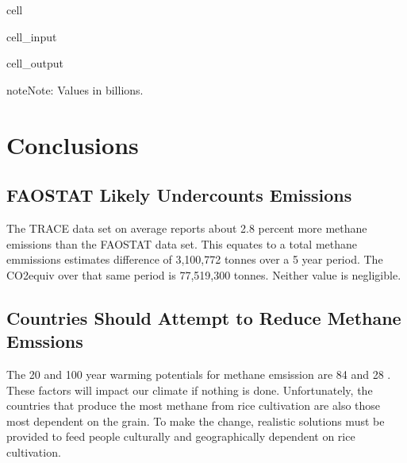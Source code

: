 \documentclass[letterpaper,10pt,english]{jupyterBook}
\begin{document}
\begin{sphinxuseclass}{cell}
\begin{sphinxVerbatimInput}
\begin{sphinxuseclass}{cell_input}
\end{sphinxuseclass}\end{sphinxVerbatimInput}
\begin{sphinxVerbatimOutput}

\begin{sphinxuseclass}{cell_output}
\noindent{}

\end{sphinxuseclass}\end{sphinxVerbatimOutput}

\end{sphinxuseclass}
\begin{sphinxadmonition}{note}{Note:}
\sphinxAtStartPar
Values in billions.
\end{sphinxadmonition}


\section{Conclusions}
\label{\detokenize{notebooks/full_post:conclusions}}

\subsection{FAOSTAT Likely Undercounts Emissions}
\label{\detokenize{notebooks/full_post:faostat-likely-undercounts-emissions}}
\sphinxAtStartPar
The TRACE data set on average reports about 2.8 percent more methane emissions than the FAOSTAT data set.  This equates to a total methane emmissions estimates difference of 3,100,772 tonnes over a 5 year period.  The CO2equiv over that same period is 77,519,300 tonnes.  Neither value is negligible.


\subsection{Countries Should Attempt to Reduce Methane Emssions}
\label{\detokenize{notebooks/full_post:countries-should-attempt-to-reduce-methane-emssions}}
\sphinxAtStartPar
The 20 and 100 year warming potentials for methane emsission are 84 and 28 .  These factors will impact our climate if nothing is done.  Unfortunately, the countries that produce the most methane from rice cultivation are also those most dependent on the grain.  To make the change, realistic solutions must be provided to feed people culturally and geographically dependent on rice cultivation.
\end{document}
